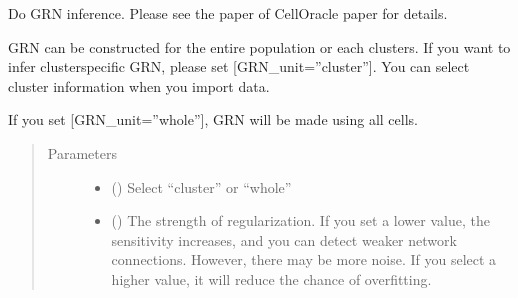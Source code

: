 \documentclass[letterpaper,10pt,english]{sphinxmanual}
\begin{document}
\begin{fulllineitems}
\begin{fulllineitems}
\begin{quote}
\begin{description}
\end{description}\end{quote}

\end{fulllineitems}


\begin{fulllineitems}
\label{\detokenize{modules/celloracle:celloracle.Oracle.fit_GRN_for_simulation}}
Do GRN inference.
Please see the paper of CellOracle paper for details.

GRN can be constructed for the entire population or each clusters.
If you want to infer cluster\sphinxhyphen{}specific GRN, please set {[}GRN\_unit=”cluster”{]}.
You can select cluster information when you import data.

If you set {[}GRN\_unit=”whole”{]}, GRN will be made using all cells.
\begin{quote}\begin{description}
\item[{Parameters}] \leavevmode\begin{itemize}
\item {} 
 () \textendash{} Select “cluster” or “whole”

\item {} 
 () \textendash{} The strength of regularization.
If you set a lower value, the sensitivity increases, and you can detect weaker network connections. However, there may be more noise.
If you select a higher value, it will reduce the chance of overfitting.

\end{itemize}

\end{description}\end{quote}


\end{fulllineitems}
\end{fulllineitems}
\end{document}
